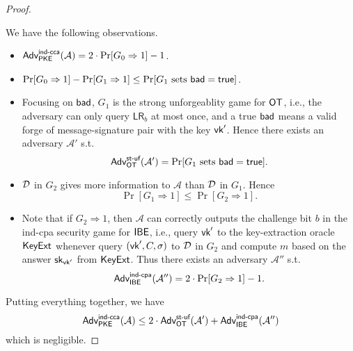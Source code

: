 \documentclass[12pt]{article}
\newcommand{\getsr}{\stackrel{\$}{\gets}}
\newcommand{\Adv}{\textsf{Adv}}
\newcommand{\true}{\textsf{true}}
\theoremstyle{definition}
\newcommand{\PKE}{\textsf{PKE}}
\newcommand{\Kg}{\textsf{Kg}}
\newcommand{\sk}{\textsf{sk}}
\newcommand{\A}{\mathcal{A}}
\newcommand{\LR}{\textsf{LR}}
\begin{document}
\begin{proof}
\begin{itemize}
\end{itemize}
We have the following observations.
\begin{itemize}
\item $\Adv_{\PKE}^{\cca}(\A) = 2\cdot\Pr[G_0 \Rightarrow 1]-1$.
\item $\Pr[G_0 \Rightarrow 1] - \Pr[G_1 \Rightarrow 1] \leq \Pr[\textrm{$G_1$ sets $\bad = \true$}]$.
\item Focusing on $\textsf{bad}$, $G_1$ is the strong unforgeablity game for $\textsf{OT}$, i.e., the adversary can only query $\LR_b$ at most once, and a true $\textsf{bad}$ means a valid forge of message-signature pair with the key $\textsf{vk}'$. Hence there exists an adversary $\A'$ s.t. 
	$$\Adv_{\OT}^{\textsf{st-uf}}(\A') = \Pr[\textrm{$G_1$ sets $\bad = \true$}].$$
\item $\mathcal{D}$ in $G_2$ gives more information to $\A$ than $\mathcal{D}$ in $G_1$. Hence 
$$\Pr[G_1 \Rightarrow 1] \leq \Pr[G_2 \Rightarrow 1].$$
\item Note that if $G_2 \Rightarrow 1$, then $\A$ can correctly outputs the challenge bit $b$ in the ind-cpa security game for $\textsf{IBE}$, i.e., query $\textsf{vk}'$ to the key-extraction oracle $\textsf{KeyExt}$ whenever query $(\textsf{vk}', C,\sigma)$ to $\mathcal{D}$ in $G_2$ and compute $m$ based on the answer $\sk_{\vk'}$ from $\textsf{KeyExt}$. Thus there exists an adversary $\A''$ s.t.
$$\Adv_{\IBE}^{\cpa}(\A'') = 2\cdot\Pr[G_2 \Rightarrow 1] - 1.$$
\end{itemize}
Putting everything together, we have
$$\Adv_{\PKE}^{\cca}(\A) \leq 2\cdot\Adv_{\OT}^{\textsf{st-uf}}(\A') + \Adv_{\IBE}^{\cpa}(\A'')$$
which is negligible.
\end{proof}
\end{document}
